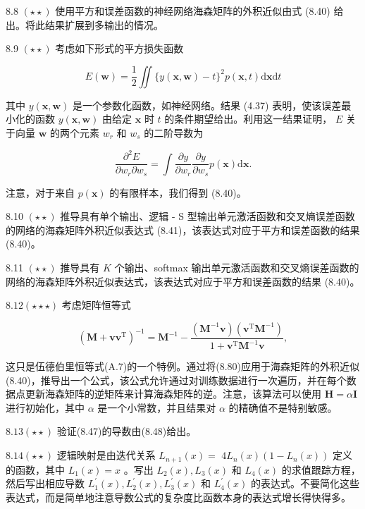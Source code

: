 \documentclass[10pt]{article}
\begin{document}
8.8 \(\left( {\star  \star  }\right)\) 使用平方和误差函数的神经网络海森矩阵的外积近似由式 (8.40) 给出。将此结果扩展到多输出的情况。

8.9 \(\left( {\star  \star  }\right)\) 考虑如下形式的平方损失函数

\[
E\left( \mathbf{w}\right)  = \frac{1}{2}\iint \{ y\left( {\mathbf{x},\mathbf{w}}\right)  - t{\} }^{2}p\left( {\mathbf{x},t}\right) \mathrm{d}\mathbf{x}\mathrm{d}t \tag{8.78}
\]

其中 \(y\left( {\mathbf{x},\mathbf{w}}\right)\) 是一个参数化函数，如神经网络。结果 (4.37) 表明，使该误差最小化的函数 \(y\left( {\mathbf{x},\mathbf{w}}\right)\) 由给定 \(\mathbf{x}\) 时 \(t\) 的条件期望给出。利用这一结果证明， \(E\) 关于向量 \(\mathbf{w}\) 的两个元素 \({w}_{r}\) 和 \({w}_{s}\) 的二阶导数为

\[
\frac{{\partial }^{2}E}{\partial {w}_{r}\partial {w}_{s}} = \int \frac{\partial y}{\partial {w}_{r}}\frac{\partial y}{\partial {w}_{s}}p\left( \mathbf{x}\right) \mathrm{d}\mathbf{x}. \tag{8.79}
\]

注意，对于来自 \(p\left( \mathbf{x}\right)\) 的有限样本，我们得到 (8.40)。

8.10 \(\left( {\star  \star  }\right)\) 推导具有单个输出、逻辑 - S 型输出单元激活函数和交叉熵误差函数的网络的海森矩阵外积近似表达式 (8.41)，该表达式对应于平方和误差函数的结果 (8.40)。

8.11 \(\left( {\star  \star  }\right)\) 推导具有 \(K\) 个输出、softmax 输出单元激活函数和交叉熵误差函数的网络的海森矩阵外积近似表达式，该表达式对应于平方和误差函数的结果 (8.40)。

\({8.12}\left( {\star  \star   \star  }\right)\) 考虑矩阵恒等式

\[
{\left( \mathbf{M} + \mathbf{v}{\mathbf{v}}^{\mathrm{T}}\right) }^{-1} = {\mathbf{M}}^{-1} - \frac{\left( {{\mathbf{M}}^{-1}\mathbf{v}}\right) \left( {{\mathbf{v}}^{\mathrm{T}}{\mathbf{M}}^{-1}}\right) }{1 + {\mathbf{v}}^{\mathrm{T}}{\mathbf{M}}^{-1}\mathbf{v}}, \tag{8.80}
\]

这只是伍德伯里恒等式(A.7)的一个特例。通过将(8.80)应用于海森矩阵的外积近似(8.40)，推导出一个公式，该公式允许通过对训练数据进行一次遍历，并在每个数据点更新海森矩阵的逆矩阵来计算海森矩阵的逆。注意，该算法可以使用 \(\mathbf{H} = \alpha \mathbf{I}\) 进行初始化，其中 \(\alpha\) 是一个小常数，并且结果对 \(\alpha\) 的精确值不是特别敏感。

\({8.13}\left( {\star  \star  }\right)\) 验证(8.47)的导数由(8.48)给出。

\({8.14}\left( {\star  \star  }\right)\) 逻辑映射是由迭代关系 \({L}_{n + 1}\left( x\right)  =\)  \(4{L}_{n}\left( x\right) \left( {1 - {L}_{n}\left( x\right) }\right)\) 定义的函数，其中 \({L}_{1}\left( x\right)  = x\) 。写出 \({L}_{2}\left( x\right) ,{L}_{3}\left( x\right)\) 和 \({L}_{4}\left( x\right)\) 的求值跟踪方程，然后写出相应导数 \({L}_{1}^{\prime }\left( x\right) ,{L}_{2}^{\prime }\left( x\right) ,{L}_{3}^{\prime }\left( x\right)\) 和 \({L}_{4}^{\prime }\left( x\right)\) 的表达式。不要简化这些表达式，而是简单地注意导数公式的复杂度比函数本身的表达式增长得快得多。
\end{document}
